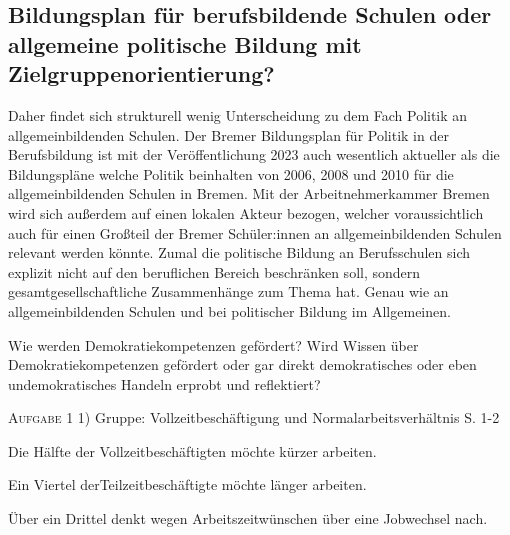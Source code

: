 


\subsection{Bildungsplan für berufsbildende Schulen oder allgemeine politische Bildung mit Zielgruppenorientierung?}
Daher findet sich strukturell wenig Unterscheidung zu dem Fach Politik an allgemeinbildenden Schulen.
Der Bremer Bildungsplan für Politik in der Berufsbildung ist mit der Veröffentlichung 2023 auch wesentlich aktueller als die Bildungspläne welche Politik beinhalten von 2006, 2008 und 2010 für die allgemeinbildenden Schulen in Bremen. 
Mit der Arbeitnehmerkammer Bremen wird sich außerdem auf einen lokalen Akteur bezogen, welcher voraussichtlich auch für einen Großteil der Bremer Schüler:innen an allgemeinbildenden Schulen relevant werden könnte. 
Zumal die politische Bildung an Berufsschulen sich explizit nicht auf den beruflichen Bereich beschränken soll, sondern gesamtgesellschaftliche Zusammenhänge zum Thema hat. Genau wie an allgemeinbildenden Schulen und bei politischer Bildung im Allgemeinen.


Wie werden Demokratiekompetenzen gefördert? Wird Wissen über Demokratiekompetenzen gefördert oder gar direkt demokratisches oder eben undemokratisches Handeln erprobt und reflektiert?


\textsc{Aufgabe 1} 1) Gruppe: Vollzeitbeschäftigung und Normalarbeitsverhältnis S. 1-2 \quad 
\begin{myitemize}
    \item Die Hälfte der Vollzeitbeschäftigten möchte kürzer arbeiten.
    \item Ein Viertel derTeilzeitbeschäftigte möchte länger arbeiten.
    \item Über ein Drittel denkt wegen Arbeitszeitwünschen über eine Jobwechsel nach.
    \item 
\end{myitemize}


